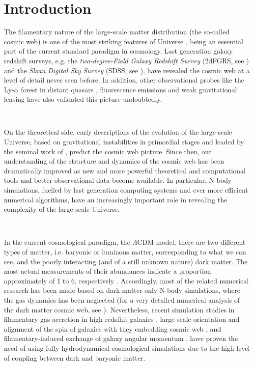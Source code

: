 \documentclass[a4,useAMS,usenatbib,usegraphicx,12pt]{article}
\begin{document}
\newpage

\section{Introduction}


The filamentary nature of the large-scale matter distribution (the so-called 
cosmic web) is one of the most striking features of Universe \citep{Bond96}, 
being an essential part of the current standard paradigm in cosmology. Last 
generation galaxy redshift surveys, e.g. the \textit{two-degree-Field Galaxy 
Redshift Survey} (2dFGRS, see \citet{Colless03}) and the \textit{Sloan Digital 
Sky Survey} (SDSS, see \citet{Abazajian09}), have revealed the cosmic web at a 
level of detail never seen before. In addition, other observational probes like
the Ly-$\alpha$ forest in distant quasars \citep{Rauch98, Cantalupo14}, 
fluorescence emissions \citep{Cantalupo12} and weak gravitational lensing 
\citep{Massey07, Dietrich12} have also validated this picture undoubtedly.

\

On the theoretical side, early descriptions of the evolution of the large-scale
Universe, based on gravitational instabilities in primordial stages and leaded 
by the seminal work of \citet{Zeldovich70}, predict the cosmic web picture. 
Since then, our understanding of the structure and dynamics of the cosmic web 
has been dramatically improved as new and more powerful theoretical and 
computational tools and better observational data become available. In 
particular, N-body simulations, fuelled by last generation computing systems 
and ever more efficient numerical algorithms, have an increasingly important 
role in revealing the complexity of the large-scale Universe.

\

In the current cosmological paradigm, the $\Lambda$CDM model, there are two 
different types of matter, i.e. baryonic or luminous matter, corresponding 
to what we can see, and the poorly interacting (and of a still unknown nature) 
dark matter. The most actual measurements of their abundances indicate a 
proportion approximately of 1 to 6, respectively \citep{Planck13XVI}. 
Accordingly, most of the related numerical research has been made based on 
dark matter-only N-body simulations, where the gas dynamics has been 
neglected (for a very detailed numerical analysis of the dark matter cosmic 
web, see \citet{Cautun14}). Nevertheless, recent simulation studies in 
filamentary gas accretion in high redsfhit galaxies \citep{Dekel09}, 
large-scale orientation and alignment of the spin of galaxies with they 
embedding cosmic web \citep{Hahn10}, and filamentary-induced exchange of 
galaxy angular momentum \citep{Dubois14}, have proven the need of using 
fully hydrodynamical cosmological simulations due to the high level of coupling
between dark and baryonic matter.
\end{document}
